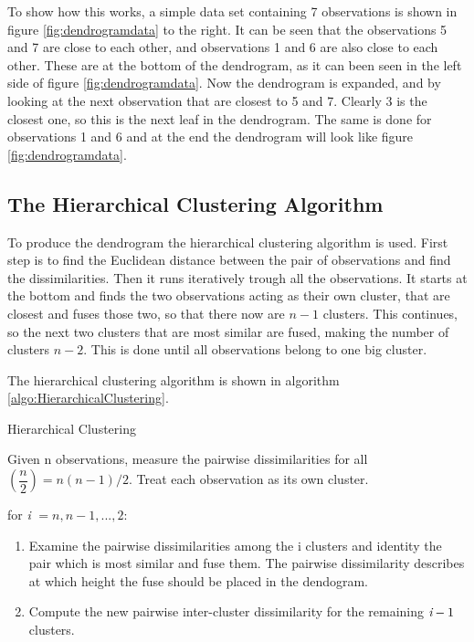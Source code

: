 
\FloatBarrier
To show how this works, a simple data set containing 7 observations is shown in figure \ref{fig:dendrogramdata} to the right.
It can be seen that the observations 5 and 7 are close to each other, and observations 1 and 6 are also close to each other. These are at the bottom of the dendrogram, as it can been seen in the left side of figure \ref{fig:dendrogramdata}. Now the dendrogram is expanded, and by looking at the next observation that are closest to 5 and 7. Clearly 3 is the closest one, so this is the next leaf in the dendrogram. The same is done for observations 1 and 6 and at the end the dendrogram will look like figure \ref{fig:dendrogramdata}.


\FloatBarrier
\subsection{The Hierarchical Clustering Algorithm}
To produce the dendrogram the hierarchical clustering algorithm is used. First step is to find the Euclidean distance between the pair of observations and find the dissimilarities.
Then it runs iteratively trough all the observations. It starts at the bottom and finds the two observations acting as their own cluster, that are closest and fuses those two, so that there now are $n-1$ clusters. This continues, so the next two clusters that are most similar are fused, making the number of clusters $n-2$. This is done until all observations belong to one big cluster.

The hierarchical clustering algorithm is shown in algorithm \ref{algo:HierarchicalClustering}.

\begin{algorithm}
	\caption{Hierarchical Clustering}
	\label{algo:HierarchicalClustering}
	\begin{algorithmic}[1]
 		\State Given n observations, measure the pairwise dissimilarities for all  $(\dfrac{n}{2}) =n(n-1)/2 $. Treat each observation as its own cluster.
 		
 		\State for \emph{i} $= n,n-1,...,2:$
 		\begin{enumerate}[label=(\alph*)]
 			\item Examine the pairwise dissimilarities among the i clusters and identity the pair which is most similar and fuse them. The pairwise dissimilarity describes at which height the fuse should be placed in the dendogram.
 			\item Compute the new pairwise inter-cluster dissimilarity for the remaining $\emph{i}-1$ clusters.
 		\end{enumerate}
 	\end{algorithmic}
 \end{algorithm}

